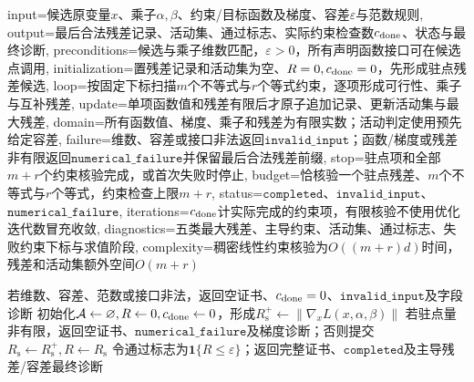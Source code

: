 \begin{AlgorithmContract}{
  input={候选原变量$x$、乘子$\alpha,\beta$、约束/目标函数及梯度、容差$\varepsilon$与范数规则},
  output={最后合法残差记录、活动集、通过标志、实际约束检查数$c_{\rm done}$、状态与最终诊断},
  preconditions={候选与乘子维数匹配，$\varepsilon>0$，所有声明函数接口可在候选点调用},
  initialization={置残差记录和活动集为空、$R=0,c_{\rm done}=0$，先形成驻点残差候选},
  loop={按固定下标扫描$m$个不等式与$r$个等式约束，逐项形成可行性、乘子与互补残差},
  update={单项函数值和残差有限后才原子追加记录、更新活动集与最大残差},
  domain={所有函数值、梯度、乘子和残差为有限实数；活动判定使用预先给定容差},
  failure={维数、容差或接口非法返回$\mathtt{invalid\_input}$；函数/梯度或残差非有限返回$\mathtt{numerical\_failure}$并保留最后合法残差前缀},
  stop={驻点项和全部$m+r$个约束核验完成，或首次失败时停止},
  budget={恰核验一个驻点残差、$m$个不等式与$r$个等式，约束检查上限$m+r$},
  status={$\mathtt{completed}$、$\mathtt{invalid\_input}$、$\mathtt{numerical\_failure}$},
  iterations={$c_{\rm done}$计实际完成的约束项，有限核验不使用优化迭代数冒充收敛},
  diagnostics={五类最大残差、主导约束、活动集、通过标志、失败约束下标与求值阶段},
  complexity={稠密线性约束核验为$O((m+r)d)$时间，残差和活动集额外空间$O(m+r)$}
}
\begin{algorithm}[H]
\caption{候选原--对偶解的KKT残差检验}\label{alg:V1-C07-kkt-check}
若维数、容差、范数或接口非法，返回空证书、$c_{\rm done}=0$、$\mathtt{invalid\_input}$及字段诊断\;
初始化$\mathcal A\leftarrow\varnothing,R\leftarrow0,c_{\rm done}\leftarrow0$，形成$R_{\mathrm s}^+\leftarrow\|\nabla_xL(x,\alpha,\beta)\|$\;
若驻点量非有限，返回空证书、$\mathtt{numerical\_failure}$及梯度诊断；否则提交$R_{\mathrm s}\leftarrow R_{\mathrm s}^+,R\leftarrow R_{\mathrm s}$\;
令通过标志为$\mathbf1\{R\le\varepsilon\}$；返回完整证书、$\mathtt{completed}$及主导残差/容差最终诊断\;
\end{algorithm}
\end{AlgorithmContract}

